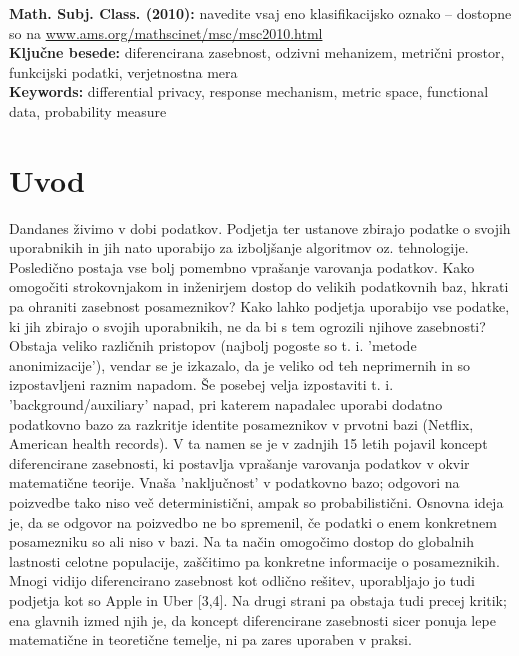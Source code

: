 \documentclass[12pt,a4paper]{amsart}
\theoremstyle{definition} %
\theoremstyle{plain} %
\begin{document}
\vfill\noindent
{\bf Math. Subj. Class. (2010):} navedite vsaj eno klasifikacijsko oznako -- dostopne so na \url{www.ams.org/mathscinet/msc/msc2010.html}  \\[1mm]  
{\bf Ključne besede:} diferencirana zasebnost, odzivni mehanizem, metrični prostor, funkcijski podatki, verjetnostna mera  \\[1mm]  
{\bf Keywords:} differential privacy, response mechanism, metric space, functional data, probability measure
\pagebreak



\section{Uvod}
Dandanes živimo v dobi podatkov. Podjetja ter ustanove zbirajo podatke o svojih uporabnikih in jih nato uporabijo za izboljšanje algoritmov oz. tehnologije. Posledično postaja vse bolj pomembno  vprašanje  varovanja podatkov. Kako omogočiti strokovnjakom in inženirjem dostop do velikih podatkovnih baz, hkrati pa ohraniti zasebnost posameznikov? Kako lahko podjetja uporabijo vse podatke, ki jih zbirajo o svojih uporabnikih, ne da bi s tem ogrozili njihove zasebnosti? Obstaja veliko različnih pristopov (najbolj pogoste so t. i. 'metode anonimizacije'), vendar se je izkazalo, da je veliko od teh neprimernih in so izpostavljeni raznim napadom. Še posebej velja izpostaviti t. i. 'background/auxiliary' napad, pri katerem napadalec uporabi dodatno podatkovno bazo za razkritje identite posameznikov v prvotni bazi (Netflix, American health records).  V ta namen se je v zadnjih 15 letih pojavil koncept diferencirane zasebnosti, ki postavlja vprašanje varovanja podatkov v okvir matematične teorije. Vnaša 'naključnost' v podatkovno bazo; odgovori na poizvedbe tako niso več deterministični, ampak so probabilistični. Osnovna ideja je, da se odgovor na poizvedbo ne bo spremenil, če podatki o enem konkretnem posamezniku so ali niso v bazi. Na ta način omogočimo dostop do globalnih lastnosti celotne populacije, zaščitimo pa konkretne informacije o posameznikih. Mnogi vidijo diferencirano zasebnost kot odlično rešitev, uporabljajo jo tudi podjetja kot so Apple in Uber [3,4]. Na drugi strani pa obstaja tudi precej kritik; ena glavnih izmed njih je, da koncept diferencirane zasebnosti sicer ponuja lepe matematične in teoretične temelje, ni pa zares uporaben v praksi. 
\newline
\newline
\end{document}
